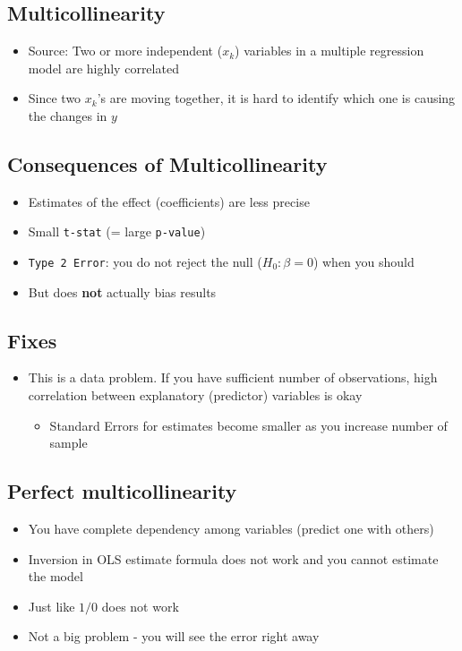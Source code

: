 \documentclass[10pt,article]{article}
\begin{document}
\subsection{Multicollinearity}
\label{sec:org24e9259}

\begin{itemize}
\item Source: Two or more independent (\(x_k\)) variables in a multiple
regression model are highly correlated

\item Since two \(x_k\)'s are moving together, it is hard to identify
which one is causing the changes in \(y\)
\end{itemize}

\subsection{Consequences of Multicollinearity}
\label{sec:org861e13f}
\begin{itemize}
\item Estimates of the effect (coefficients) are less precise
\item Small \texttt{t-stat} (= large \texttt{p-value})
\item \texttt{Type 2 Error}: you do not reject the null (\(H_0: \beta=0\)) when you
should
\item But does \textbf{not} actually bias results
\end{itemize}
\subsection{Fixes}
\label{sec:org9179bd5}
\begin{itemize}
\item This is a data problem. If you have sufficient number of observations, high
correlation between explanatory (predictor) variables is okay

\begin{itemize}
\item Standard Errors for estimates become smaller as you increase number of
sample
\end{itemize}
\end{itemize}
\subsection{Perfect multicollinearity}
\label{sec:orgb2bfa19}
\begin{itemize}
\item You have complete dependency among variables (predict one with others)
\item Inversion in OLS estimate formula does not work and you cannot estimate the
model
\item Just like \(1/0\) does not work
\item Not a big problem - you will see the error right away
\end{itemize}
\end{document}
